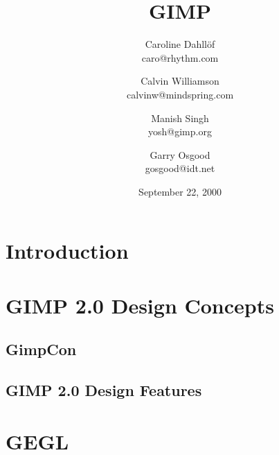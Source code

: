 \documentclass{report}
\begin{document}
\begin{titlepage}
\title{\huge GIMP}
\author{Caroline Dahll\"{o}f\\
caro@rhythm.com 
\and Calvin Williamson\\
calvinw@mindspring.com
\and Manish Singh\\
yosh@gimp.org
\and Garry Osgood\\
gosgood@idt.net}
\date{September 22, 2000}
\maketitle
\end{titlepage}
\tableofcontents


% 
%




\chapter{Introduction}
\label{ch:Introduction}



\chapter{GIMP 2.0 Design Concepts}
\label{ch:GIMP_2.0}


\section{GimpCon}
\label{sec:GimpCon}


\section{GIMP 2.0 Design Features}
\label{sec:GIMP_2.0_Design}




\chapter{GEGL}
\label{ch:GEGL}

\end{document}
